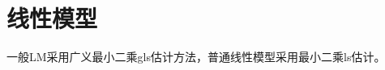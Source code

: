 \documentclass[b5paper]{article}
\begin{document}
\tableofcontents

\section{线性模型}

一般\gls{LM}采用广义最小二乘\gls{gls}估计方法，普通线性模型采用最小二乘\gls{ls}估计。

\printindex
\printnoidxglossary[sort=word,title={术语表}] %
\end{document}
